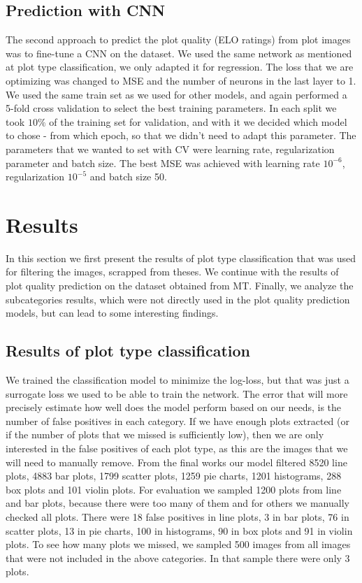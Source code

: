 \documentclass[fleqn,moreauthors,10pt]{ds_report}
\begin{document}
\subsection*{Prediction with CNN}
The second approach to predict the plot quality (ELO ratings) from plot images was to fine-tune a CNN on the dataset. We used the same network as mentioned at plot type classification, we only adapted it for regression. The loss that we are optimizing was changed to MSE and the number of neurons in the last layer to 1.
We used the same train set as we used for other models, and again performed a 5-fold cross validation to select the best training parameters. In each split we took $10\%$ of the training set for validation, and with it we decided which model to chose - from which epoch, so that we didn't need to adapt this parameter. The parameters that we wanted to set with CV were learning rate, regularization parameter and batch size. The best MSE was achieved with learning rate $10^{-6}$, regularization $10^{-5}$ and batch size 50.

\section*{Results}
In this section we first present the results of plot type classification that was used for filtering the images, scrapped from theses. We continue with the results of plot quality prediction on the dataset obtained from MT. Finally, we analyze the subcategories results, which were not directly used in the plot quality prediction models, but can lead to some interesting findings.

\subsection*{Results of plot type classification}
We trained the classification model to minimize the log-loss, but that was just a surrogate loss we used to be able to train the network. The error that will more precisely estimate how well does the model perform based on our needs, is the number of false positives in each category. If we have enough plots extracted (or if the number of plots that we missed is sufficiently low), then we are only interested in the false positives of each plot type, as this are the images that we will need to manually remove.
From the final works our model filtered 8520 line plots, 4883 bar plots, 1799 scatter plots, 1259 pie charts, 1201 histograms, 288 box plots and 101 violin plots. For evaluation we sampled 1200 plots from line and bar plots, because there were too many of them and for others we manually checked all plots. There were 18 false positives in line plots, 3 in bar plots, 76 in scatter plots, 13 in pie charts, 100 in histograms, 90 in box plots and 91 in violin plots. To see how many plots we missed, we sampled 500 images from all images that were not included in the above categories. In that sample there were only 3 plots.
\end{document}
